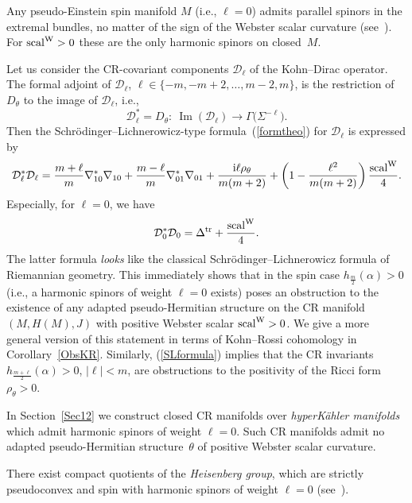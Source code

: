 \documentclass[10pt,a4paper]{amsart}
\numberwithin{equation}{section}
\begin{document}
\begin{Example}
Any pseudo-Einstein spin manifold $M$ (i.e., $\ell=0$) admits parallel spinors in the extremal bundles, no matter of the sign of the
Webster scalar curvature (see~\cite{LeiN2}). For ${\rm scal}^{\rm W}>0$ these are the only harmonic spinors on closed~$M$.
\end{Example}

Let us consider the CR-covariant components $\mathcal{D}_\ell$ of the Kohn--Dirac operator.
The formal adjoint of $\mathcal{D}_\ell$, $\ell\in\{-m,-m+2,\dots,m-2,m\}$, is the restriction of $D_\theta$ to the image of $\mathcal{D}_\ell$, i.e.,
\[
\mathcal{D}_\ell^*=D_\theta\colon \ \operatorname{Im}(\mathcal{D}_\ell) \to \Gamma\big(\Sigma^{-\ell}\big).
\]
Then the Schr\"odinger--Lichnerowicz-type formula~(\ref{formtheo}) for $\mathcal{D}_\ell$
is expressed by
\begin{gather}
\mathcal{D}_\ell^*\mathcal{D}_\ell = \frac{m+\ell}{m}\nabla^*_{10}\nabla_{10} + \frac{m-\ell}{m}\nabla^*_{01}\nabla_{01}
 + \frac{{\rm i}\ell\rho_\theta}{m(m+2)}
+\left(1-\frac{\ell^2}{m(m+2)}\right)\frac{{\rm scal}^{\rm W}}{4}.\label{SLformula}
\end{gather}
Especially, for $\ell=0$, we have
\[
\mathcal{D}_0^*\mathcal{D}_0 = \Delta^{\rm tr} + \frac{{\rm scal}^{\rm W}}{4}.
\]
The latter formula {\em looks} like the classical Schr\"odinger--Lichnerowicz formula of Riemannian geometry.
This immediately shows that in the spin case $h_{\frac{m}{2}}(\alpha)>0$ (i.e., a harmonic spinors of weight $\ell=0$ exists)
poses an obstruction to the existence of any adapted pseudo-Hermitian structure on the CR manifold $(M,H(M),J)$ with positive Webster scalar ${\rm scal}^{\rm W}>0$.
We give a more general version of this statement in terms of Kohn--Rossi cohomology in Corollary~\ref{ObsKR}.
Similarly, (\ref{SLformula}) implies that the CR invariants $h_{\frac{m+\ell}{2}}(\alpha)>0$, $|\ell|< m$, are obstructions
to the positivity of the Ricci form $\rho_\theta>0$.

\begin{Example} In Section~\ref{Sec12} we construct closed CR manifolds over {\em hyperK\"ahler manifolds} which admit harmonic spinors
of weight $\ell=0$. Such CR manifolds admit no adapted pseudo-Hermitian structure~$\theta$ of positive Webster scalar curvature.
\end{Example}
\begin{Example}
 There exist compact quotients of the {\em Heisenberg group}, which are strictly pseudoconvex and spin with harmonic spinors of weight $\ell=0$ (see~\cite{Stadt}).
\end{Example}
\end{document}
